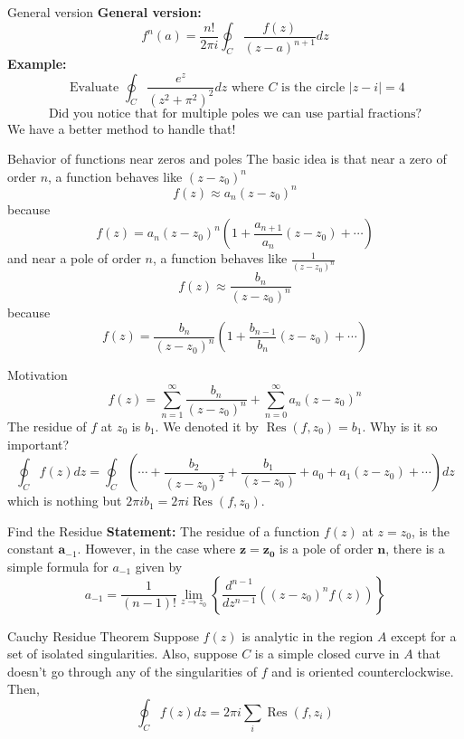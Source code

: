 \documentclass[11pt]{beamer}
\theoremstyle{plain}
\begin{document}
\begin{frame}{General version}
    \textbf{General version:}
$$
f^n(a)=\frac{n!}{2 \pi i} \oint_C \frac{f(z)}{(z-a)^{n+1}} d z
$$
\textbf{Example:} 
$$
\text { Evaluate } \oint_C \frac{e^z}{\left(z^2+\pi^2\right)^2} d z \text { where } C \text { is the circle }|z-i|=4
$$
$$\boxed{\text{Did you notice that for multiple poles we can use partial fractions?}}$$
We have a better method to handle that!
\end{frame}

\begin{frame}{Behavior of functions near zeros and poles}
    The basic idea is that near a zero of order $n$, a function behaves like $(z-z_0)^n$ 
    $$f(z)\approx a_n (z-z_0)^n$$
    because $$f(z)=a_n(z-z_0)^n\left( 1+\frac{a_{n+1}}{a_n}(z-z_0)+\cdots \right)$$  
    and near a pole of order $n$, a function behaves like $\frac{1}{(z-z_0)^n}$
    $$f(z)\approx \frac{b_n}{(z-z_0)^n}$$
    because 
    $$f(z)=\frac{b_n}{(z-z_0)^n}\left(1+\frac{b_{n-1}}{b_n} (z-z_0)+\cdots \right)$$
\end{frame}

\begin{frame}{Motivation}
    $$f(z)=\sum_{n=1}^\infty \frac{b_n}{(z-z_0)^n}+\sum_{n=0}^\infty a_n(z-z_0)^n$$
    The residue of $f$ at $z_0$ is $b_1$. We denoted it by $\operatorname{Res}(f,z_0)=b_1$. Why is it so important? 
    $$\oint_C f(z) dz=\oint_C\left(\cdots+\frac{b_2}{(z-z_0)^2}+\frac{b_1}{(z-z_0)}+a_0+a_1(z-z_0)+\cdots\right)dz$$
    which is nothing but $2\pi i b_1=2\pi i \operatorname{Res}(f,z_0)$.
\end{frame}

\begin{frame}{Find the Residue}
    \textbf{Statement:} The residue of a function $f(z)$ at $z=z_0$, is the constant $\boldsymbol{a}_{-1}$.
However, in the case where $\boldsymbol{z}=\boldsymbol{z}_{\mathbf{0}}$ is a pole of order $\mathbf{n}$, there is a simple formula for $a_{-1}$ given by
$$
a_{-1}=\frac{1}{(n-1)!} \lim _{z \rightarrow z_0}\left\{\frac{d^{n-1}}{d z^{n-1}}\left(\left(z-z_0\right)^n f(z)\right)\right\}
$$
\end{frame}

\begin{frame}{Cauchy Residue Theorem}
    Suppose $f(z)$ is analytic in the region $A$ except for a set of isolated singularities. Also, suppose $C$ is a simple closed curve in $A$ that doesn't go through any of the singularities of $f$ and is oriented counterclockwise. Then,
    $$\oint_Cf(z)dz=2\pi i\sum_i \operatorname{Res}(f,z_i)$$ 
\end{frame}
\end{document}
